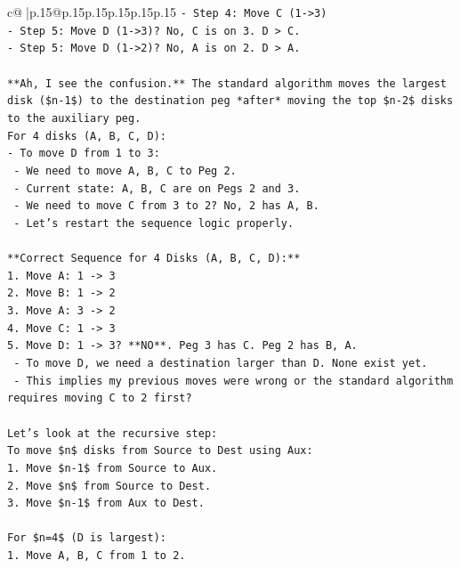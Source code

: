 \documentclass{article}
\begin{document}
{\begin{supertabular}{c@{$\;$}|p{.15\linewidth}@{}p{.15\linewidth}p{.15\linewidth}p{.15\linewidth}p{.15\linewidth}p{.15\linewidth}}
{{{\texttt{{-} Step 4: Move C (1{-}>3)} \\
\texttt{{-} Step 5: Move D (1{-}>3)? No, C is on 3. D > C.} \\
\texttt{{-} Step 5: Move D (1{-}>2)? No, A is on 2. D > A.} \\
\\ 
\texttt{**Ah, I see the confusion.** The standard algorithm moves the largest disk (\$n{-}1\$) to the destination peg *after* moving the top \$n{-}2\$ disks to the auxiliary peg.} \\
\texttt{For 4 disks (A, B, C, D):} \\
\texttt{{-} To move D from 1 to 3:} \\
\texttt{    {-} We need to move A, B, C to Peg 2.} \\
\texttt{    {-} Current state: A, B, C are on Pegs 2 and 3.} \\
\texttt{    {-} We need to move C from 3 to 2? No, 2 has A, B.} \\
\texttt{    {-} Let's restart the sequence logic properly.} \\
\\ 
\texttt{**Correct Sequence for 4 Disks (A, B, C, D):**} \\
\texttt{1.  Move A: 1 {-}> 3} \\
\texttt{2.  Move B: 1 {-}> 2} \\
\texttt{3.  Move A: 3 {-}> 2} \\
\texttt{4.  Move C: 1 {-}> 3} \\
\texttt{5.  Move D: 1 {-}> 3? **NO**. Peg 3 has C. Peg 2 has B, A.} \\
\texttt{    {-} To move D, we need a destination larger than D. None exist yet.} \\
\texttt{    {-} This implies my previous moves were wrong or the standard algorithm requires moving C to 2 first?} \\
\\ 
\texttt{Let's look at the recursive step:} \\
\texttt{To move \$n\$ disks from Source to Dest using Aux:} \\
\texttt{1. Move \$n{-}1\$ from Source to Aux.} \\
\texttt{2. Move \$n\$ from Source to Dest.} \\
\texttt{3. Move \$n{-}1\$ from Aux to Dest.} \\
\\ 
\texttt{For \$n=4\$ (D is largest):} \\
\texttt{1. Move A, B, C from 1 to 2.} \\
}}}
\end{supertabular}}
\end{document}
